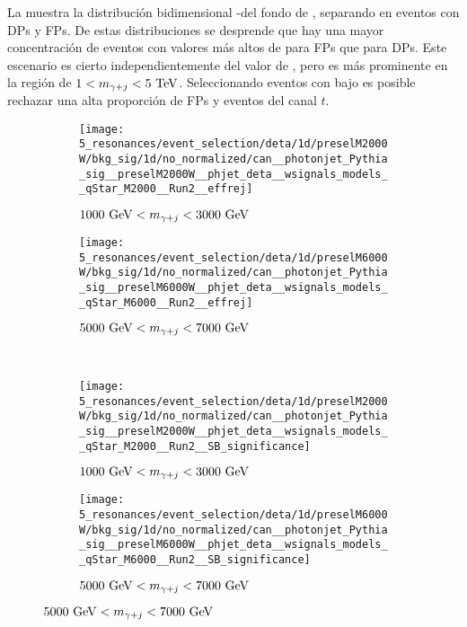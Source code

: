 La \Fig{\ref{fig:evt_selection:sr_opt:eta:deta:2d}} muestra la distribución bidimensional \Deta-\myj del fondo de \gammajet, separando en eventos con \acp{DP} y \acp{FP}.
De estas distribuciones se desprende que hay una mayor concentración de eventos con valores más altos de \detayj para \acp{FP} que para \acp{DP}. Este escenario es cierto independientemente del valor de \myj, pero es más prominente en la región de \(1 < m_{\gamma+j} < 5~\text{TeV}\). Seleccionando eventos con \detayj bajo es posible rechazar una alta proporción de \acp{FP} y eventos del canal \(t\).

\begin{figure}[ht!]
    \centering
    \begin{subfigure}[h]{0.49\linewidth}
        \centering
        \texttt{[image: 5\_resonances/event\_selection/deta/1d/preselM2000W/bkg\_sig/1d/no\_normalized/can\_\_photonjet\_Pythia\_sig\_\_preselM2000W\_\_phjet\_deta\_\_wsignals\_models\_\_qStar\_M2000\_\_Run2\_\_effrej]}
        \caption{\(1000~\text{GeV} < m_{\gamma+j} < 3000~\text{GeV}\)}
        \label{fig:evt_selection:sr_opt:eta:deta:1d:effrej_2000W}
    \end{subfigure}
    \hfill
    \begin{subfigure}[h]{0.49\linewidth}
        \centering
        \texttt{[image: 5\_resonances/event\_selection/deta/1d/preselM6000W/bkg\_sig/1d/no\_normalized/can\_\_photonjet\_Pythia\_sig\_\_preselM6000W\_\_phjet\_deta\_\_wsignals\_models\_\_qStar\_M6000\_\_Run2\_\_effrej]}
        \caption{\(5000~\text{GeV} < m_{\gamma+j} < 7000~\text{GeV}\)}
        \label{fig:evt_selection:sr_opt:eta:deta:1d:effrej_6000W}
    \end{subfigure}\\
    \begin{subfigure}[h]{0.49\linewidth}
        \centering
        \texttt{[image: 5\_resonances/event\_selection/deta/1d/preselM2000W/bkg\_sig/1d/no\_normalized/can\_\_photonjet\_Pythia\_sig\_\_preselM2000W\_\_phjet\_deta\_\_wsignals\_models\_\_qStar\_M2000\_\_Run2\_\_SB\_significance]}
        \caption{\(1000~\text{GeV} < m_{\gamma+j} < 3000~\text{GeV}\)}
        \label{fig:evt_selection:sr_opt:eta:deta:1d:SB_2000W}
    \end{subfigure}
    \hfill
    \begin{subfigure}[h]{0.49\linewidth}
        \centering
        \texttt{[image: 5\_resonances/event\_selection/deta/1d/preselM6000W/bkg\_sig/1d/no\_normalized/can\_\_photonjet\_Pythia\_sig\_\_preselM6000W\_\_phjet\_deta\_\_wsignals\_models\_\_qStar\_M6000\_\_Run2\_\_SB\_significance]}
        \caption{\(5000~\text{GeV} < m_{\gamma+j} < 7000~\text{GeV}\)}
        \label{fig:evt_selection:sr_opt:eta:deta:1d:SB_6000W}

\end{subfigure}
\end{figure}
